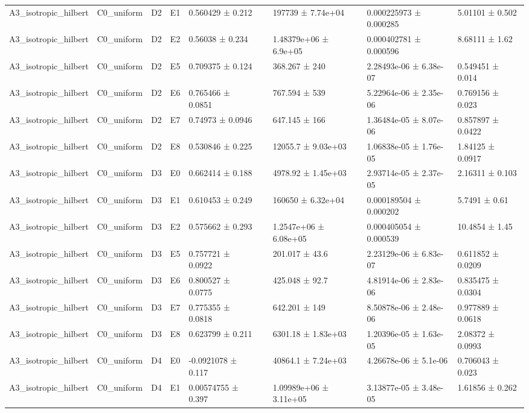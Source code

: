 \begin{table}
\begin{tabular}{lllllllll}
A3\_isotropic\_hilbert & C0\_uniform & D2 & E1 & 0.560429 ± 0.212 &  & 197739 ± 7.74e+04 & 0.000225973 ± 0.000285 & 5.01101 ± 0.502 \\
A3\_isotropic\_hilbert & C0\_uniform & D2 & E2 & 0.56038 ± 0.234 &  & 1.48379e+06 ± 6.9e+05 & 0.000402781 ± 0.000596 & 8.68111 ± 1.62 \\
A3\_isotropic\_hilbert & C0\_uniform & D2 & E5 & 0.709375 ± 0.124 &  & 368.267 ± 240 & 2.28493e-06 ± 6.38e-07 & 0.549451 ± 0.014 \\
A3\_isotropic\_hilbert & C0\_uniform & D2 & E6 & 0.765466 ± 0.0851 &  & 767.594 ± 539 & 5.22964e-06 ± 2.35e-06 & 0.769156 ± 0.023 \\
A3\_isotropic\_hilbert & C0\_uniform & D2 & E7 & 0.74973 ± 0.0946 &  & 647.145 ± 166 & 1.36484e-05 ± 8.07e-06 & 0.857897 ± 0.0422 \\
A3\_isotropic\_hilbert & C0\_uniform & D2 & E8 & 0.530846 ± 0.225 &  & 12055.7 ± 9.03e+03 & 1.06838e-05 ± 1.76e-05 & 1.84125 ± 0.0917 \\
A3\_isotropic\_hilbert & C0\_uniform & D3 & E0 & 0.662414 ± 0.188 &  & 4978.92 ± 1.45e+03 & 2.93714e-05 ± 2.37e-05 & 2.16311 ± 0.103 \\
A3\_isotropic\_hilbert & C0\_uniform & D3 & E1 & 0.610453 ± 0.249 &  & 160650 ± 6.32e+04 & 0.000189504 ± 0.000202 & 5.7491 ± 0.61 \\
A3\_isotropic\_hilbert & C0\_uniform & D3 & E2 & 0.575662 ± 0.293 &  & 1.2547e+06 ± 6.08e+05 & 0.000405054 ± 0.000539 & 10.4854 ± 1.45 \\
A3\_isotropic\_hilbert & C0\_uniform & D3 & E5 & 0.757721 ± 0.0922 &  & 201.017 ± 43.6 & 2.23129e-06 ± 6.83e-07 & 0.611852 ± 0.0209 \\
A3\_isotropic\_hilbert & C0\_uniform & D3 & E6 & 0.800527 ± 0.0775 &  & 425.048 ± 92.7 & 4.81914e-06 ± 2.83e-06 & 0.835475 ± 0.0304 \\
A3\_isotropic\_hilbert & C0\_uniform & D3 & E7 & 0.775355 ± 0.0818 &  & 642.201 ± 149 & 8.50878e-06 ± 2.48e-06 & 0.977889 ± 0.0618 \\
A3\_isotropic\_hilbert & C0\_uniform & D3 & E8 & 0.623799 ± 0.211 &  & 6301.18 ± 1.83e+03 & 1.20396e-05 ± 1.63e-05 & 2.08372 ± 0.0993 \\
A3\_isotropic\_hilbert & C0\_uniform & D4 & E0 & -0.0921078 ± 0.117 &  & 40864.1 ± 7.24e+03 & 4.26678e-06 ± 5.1e-06 & 0.706043 ± 0.023 \\
A3\_isotropic\_hilbert & C0\_uniform & D4 & E1 & 0.00574755 ± 0.397 &  & 1.09989e+06 ± 3.11e+05 & 3.13877e-05 ± 3.48e-05 & 1.61856 ± 0.262 \\

\end{tabular}
\end{table}
